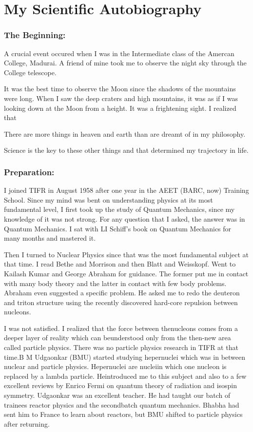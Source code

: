 \chapter{My Scientific Autobiography}

\subsection*{The Beginning:}

A crucial event occured when I was in the Intermediate class of the 
Amercan College, Madurai. A friend of mine took me to observe the night 
sky through the College telescope.
\smallskip

It was the best time to observe the Moon since the shadows of the 
mountains were long. When I saw the deep craters and high mountains, it 
was as if I was looking down at the Moon from a height. It was a 
frightening sight. I realized that
\smallskip

There are more things in heaven and earth than are dreamt of in my 
philosophy.
\smallskip

Science is the key to these other things and that determined my 
trajectory in life.

\subsection*{Preparation:}

I joined TIFR in August 1958 after one year in the AEET (BARC, now) 
Training School.  Since my mind was bent on understanding physics at its 
most fundamental level, I first took up the study of Quantum Mechanics, 
since my knowledge of it was not strong. For any question that I asked, 
the answer was in Quantum Mecha\-nics. I sat with LI Schiff's book on 
Quantum Mechanics for many months and mastered it.

Then I turned to Nuclear Physics since that was the most fundamental 
subject at that time. I read Bethe and Morrison and then Blatt and 
Weisskopf. Went to Kailash Kumar and George Abraham for guidance. The 
former put me in contact with many body theory and the latter in contact 
with few body problems. Abraham even suggested a specific problem. He 
asked me to redo the deuteron and triton structure using the recently 
discovered hard-core repulsion between nucleons.

I was not satisfied. I realized that the force between the\break nucleons 
comes from a deeper layer of reality which can be\break understood only from 
the then-new area called particle physics. There was no particle physics 
research in TIFR at that time.\break B M Udgaonkar (BMU) started studying 
hepernuclei which was in between nuclear and particle physics. 
Hepernuclei are nuclei\break in which one nucleon is replaced by a lambda 
particle. He\break introduced me to this subject and also to a few excellent\break 
reviews by Enrico Fermi on quantum theory of radiation and isospin 
symmetry. Udgaonkar was an excellent teacher. He had taught our batch of 
trainees reactor physics and the second\break batch quantum mechanics. Bhabha 
had sent him to France to learn about reactors, but BMU shifted to 
particle physics after returning.
\smallskip

